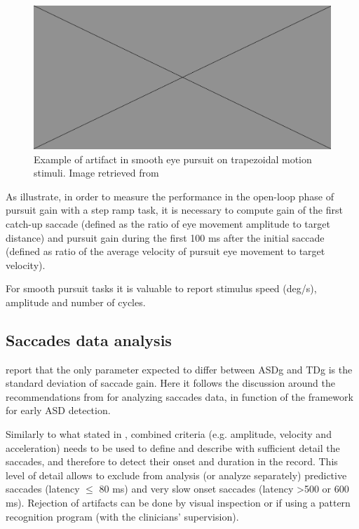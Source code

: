 \begin{figure}[h]
  \centering
  \includegraphics[width=.5\textwidth]{figures/placeholderImg.jpg}
  \caption[Blink artifact]{Example of artifact in smooth eye pursuit on trapezoidal motion stimuli. Image retrieved from \cite{randal1993smooth}}
  \label{fig:blinkartifacts}
\end{figure}

As \cite{takarae2004smoothpursuit} illustrate, in order to measure the performance in the open-loop phase of pursuit gain with a step ramp task, it is necessary to compute gain of the first catch-up saccade (defined as the ratio of eye movement amplitude to target distance) and pursuit gain during the first 100 ms after the initial saccade (defined as ratio of the average velocity of pursuit eye movement to target velocity).

For smooth pursuit tasks it is valuable to report stimulus speed (deg/s), amplitude and number of cycles.



\subsection{Saccades data analysis}
\label{sec:fwksaccadesanalysis}

\cite{johnson2016review} report that the only parameter expected to differ between ASDg and TDg is the standard deviation of saccade gain.
Here it follows the discussion around the recommendations from \cite{smyrnis2008guidelines} for analyzing saccades data, in function of the framework for early ASD detection.

Similarly to what stated in , combined criteria (e.g. amplitude, velocity and acceleration) needs to be used to define and describe with sufficient detail the saccades, and therefore to detect their onset and duration in the record. This level of detail allows to exclude from analysis (or analyze separately) predictive saccades (latency \(\leq\) 80 ms) and very slow onset saccades (latency \textgreater 500 or 600 ms). Rejection of artifacts can be done by visual inspection or if using a pattern recognition program (with the clinicians’ supervision).

